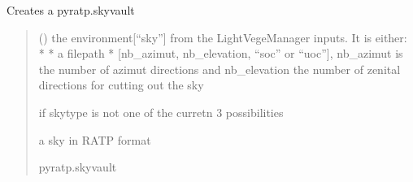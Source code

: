 \documentclass[letterpaper,10pt,english]{sphinxmanual}
\begin{document}
\begin{fulllineitems}
\label{\detokenize{reference:sky.RATPsky}}
\pysigstartsignatures
{}
\pysigstopsignatures
\sphinxAtStartPar
Creates a pyratp.skyvault
\begin{quote}\begin{description}
\sphinxAtStartPar
{} () \textendash{} the environment{[}“sky”{]} from the LightVegeManager inputs. It is either:
* 
* a filepath
* {[}nb\_azimut, nb\_elevation, “soc” or “uoc”{]}, nb\_azimut is the number of azimut directions and nb\_elevation the number of zenital directions for cutting out the sky

\sphinxAtStartPar
{} \textendash{} if skytype is not one of the curretn 3 possibilities

\sphinxAtStartPar
a sky in RATP format

\sphinxAtStartPar
pyratp.skyvault

\end{description}\end{quote}

\end{fulllineitems}

\end{document}
